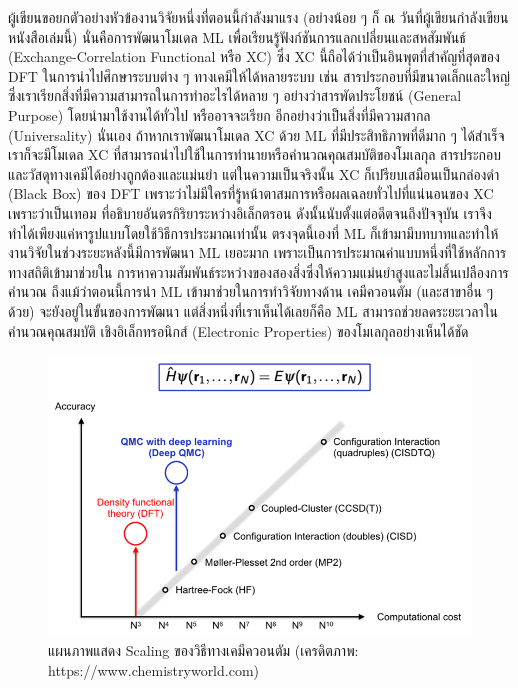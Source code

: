 ผู้เขียนขอยกตัวอย่างหัวข้องานวิจัยหนึ่งที่ตอนนี้กำลังมาแรง (อย่างน้อย ๆ ก็ ณ วันที่ผู้เขียนกำลังเขียนหนังสือเล่มนี้) นั่นคือการพัฒนาโมเดล ML 
เพื่อเรียนรู้ฟังก์ชันการแลกเปลี่ยนและสหสัมพันธ์ (Exchange-Correlation Functional หรือ XC)\autocite{balabin2009a} ซึ่ง XC 
นี้ถือได้ว่าเป็นอินพุตที่สำคัญที่สุดของ DFT ในการนำไปศึกษาระบบต่าง ๆ ทางเคมีให้ได้หลายระบบ เช่น สารประกอบที่มีขนาดเล็กและใหญ่ 
ซึ่งเราเรียกสิ่งที่มีความสามารถในการทำอะไรได้หลาย ๆ อย่างว่าสารพัดประโยชน์ (General Purpose) โดยนำมาใช้งานได้ทั่วไป หรืออาจจะเรียก%
อีกอย่างว่าเป็นสิ่งที่มีความสากล (Universality) นั่นเอง ถ้าหากเราพัฒนาโมเดล XC ด้วย ML ที่มีประสิทธิภาพที่ดีมาก ๆ ได้สำเร็จ เราก็จะมีโมเดล 
XC ที่สามารถนำไปใช้ในการทำนายหรือคำนวณคุณสมบัติของโมเลกุล สารประกอบและวัสดุทางเคมีได้อย่างถูกต้องและแม่นยำ แต่ในความเป็นจริงนั้น 
XC ก็เปรียบเสมือนเป็นกล่องดำ (Black Box) ของ DFT เพราะว่าไม่มีใครที่รู้หน้าตาสมการหรือผลเฉลยทั่วไปที่แน่นอนของ XC เพราะว่าเป็นเทอม%
ที่อธิบายอันตรกิริยาระหว่างอิเล็กตรอน ดังนั้นนับตั้งแต่อดีตจนถึงปัจจุบัน เราจึงทำได้เพียงแค่หารูปแบบโดยใช้วิธีการประมาณเท่านั้น ตรงจุดนี้เองที่ ML 
ก็เข้ามามีบทบาทและทำให้งานวิจัยในช่วงระยะหลังนี้มีการพัฒนา ML เยอะมาก เพราะเป็นการประมาณค่าแบบหนึ่งที่ใช้หลักการทางสถิติเข้ามาช่วยใน%
การหาความสัมพันธ์ระหว่างของสองสิ่งซึ่งให้ความแม่นยำสูงและไม่สิ้นเปลืองการคำนวณ ถึงแม้ว่าตอนนี้การนำ ML เข้ามาช่วยในการทำวิจัยทางด้าน%
เคมีควอนตัม (และสาขาอื่น ๆ ด้วย) จะยังอยู่ในขั้นของการพัฒนา แต่สิ่งหนึ่งที่เราเห็นได้เลยก็คือ ML สามารถช่วยลดระยะเวลาในคำนวณคุณสมบัติ%
เชิงอิเล็กทรอนิกส์ (Electronic Properties) ของโมเลกุลอย่างเห็นได้ชัด

\begin{figure}[htbp]
    \centering
    \includegraphics[width=0.9\linewidth]{fig/qm_scaling.png}
    \caption{แผนภาพแสดง Scaling ของวิธีทางเคมีควอนตัม (เครดิตภาพ: https://www.chemistryworld.com)}
    \label{fig:qm_scaling}
\end{figure}

